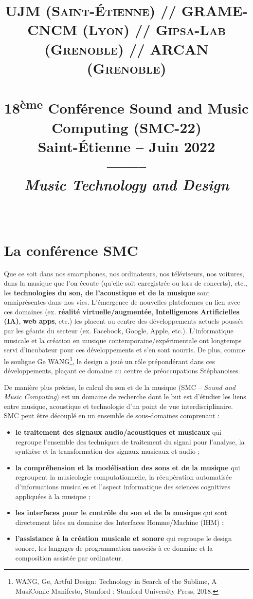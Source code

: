 \documentclass[fontsize=12pt]{scrartcl} %
\title{	
\normalfont \normalsize 
\textsc{UJM (Saint-Étienne) // GRAME-CNCM (Lyon) // Gipsa-Lab (Grenoble) // ARCAN (Grenoble)} \\ [25pt] %
\horrule{0.5pt} \\[0.4cm] %
\huge 18\textsuperscript{ème} Conférence Sound and Music Computing (SMC-22)\\Saint-Étienne -- Juin 2022\\--------\\\textit{Music Technology and Design} \\ %
\horrule{2pt} \\[0.5cm] %
}
\date{} %
\numberwithin{equation}{section} %
\numberwithin{table}{section} %
\begin{document}
\maketitle %

\tableofcontents  

\section{La conférence SMC}

Que ce soit dans nos smartphones, nos ordinateurs, nos téléviseurs, nos voitures, dans la musique que l'on écoute (qu'elle soit enregistrée ou lors de concerts), etc., les \textbf{technologies du son, de l'acoustique et de la musique} sont omniprésentes dans nos vies. L'émergence de nouvelles plateformes en lien avec ces domaines (ex. \textbf{réalité virtuelle/augmentée}, \textbf{Intelligences Artificielles (IA)}, \textbf{web apps}, etc.) les placent au centre des développements actuels poussés par les géants du secteur (ex. Facebook, Google, Apple, etc.). L'informatique musicale et la création en musique contemporaine/expérimentale ont longtemps servi d'incubateur pour ces développements et s'en sont nourris. De plus, comme le souligne Ge WANG\footnote{WANG, Ge, Artful Design: Technology in Search of the Sublime, A MusiComic Manifesto, Stanford : Stanford University Press, 2018.}, le design a joué un rôle prépondérant dans ces développements, plaçant ce domaine au centre de préoccupations Stéphanoises. 

De manière plus précise, le calcul du son et de la musique (SMC -- \textit{Sound and Music Computing}) est un domaine de recherche dont le but est d'étudier les liens entre musique, acoustique et technologie d'un point de vue interdisciplinaire. SMC peut être découplé en un ensemble de sous-domaines comprenant :

\begin{itemize}
  \item \textbf{le traitement des signaux audio/acoustiques et musicaux} qui regroupe l'ensemble des techniques de traitement du signal pour l'analyse, la synthèse et la transformation des signaux musicaux et audio ;
  \item \textbf{la compréhension et la modélisation des sons et de la musique} qui regroupent la musicologie computationnelle, la récupération automatisée d'informations musicales et l'aspect informatique des sciences cognitives appliquées à la musique ;
  \item \textbf{les interfaces pour le contrôle du son et de la musique} qui sont directement liées au domaine des Interfaces Homme/Machine (IHM) ;
  \item \textbf{l'assistance à la création musicale et sonore} qui regroupe le design sonore, les langages de programmation associés à ce domaine et la composition assistée par ordinateur.
\end{itemize}
\end{document}
